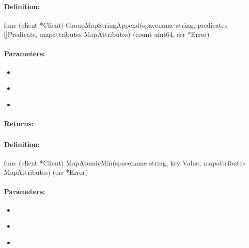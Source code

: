 \paragraph{Definition:}
\begin{gocode}
func (client *Client) GroupMapStringAppend(spacename string, predicates []Predicate, mapattributes MapAttributes) (count uint64, err *Error)
\end{gocode}

\paragraph{Parameters:}
\begin{itemize}[noitemsep]
\item {}\\

\item {}\\

\item {}\\

\end{itemize}

\paragraph{Returns:}


\pagebreak
\subsubsection{}
\label{api:Go:MapAtomicMin}


\paragraph{Definition:}
\begin{gocode}
func (client *Client) MapAtomicMin(spacename string, key Value, mapattributes MapAttributes) (err *Error)
\end{gocode}

\paragraph{Parameters:}
\begin{itemize}[noitemsep]
\item {}\\

\item {}\\

\item {}\\

\end{itemize}

